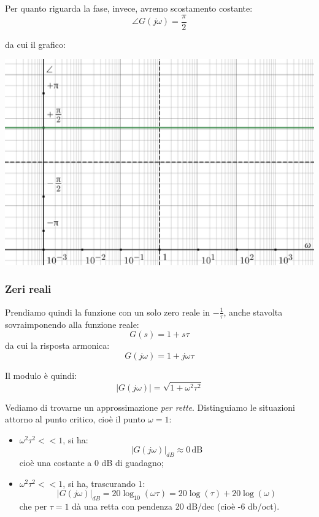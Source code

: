 \documentclass[a4paper,11pt]{article}
\begin{document}
\par\medskip

Per quanto riguarda la fase, invece, avremo scostamento costante:
$$
\angle G(j \omega) =  \frac{\pi}{2}
$$

\par\medskip

\noindent
\begin{minipage}{\textwidth}
da cui il grafico:
\begin{center}
	\includegraphics[scale=0.3]{../figures/differentiator_bode/phase.png}
\end{center}
\end{minipage}

\par\medskip

\subsubsection{Zeri reali}
Prendiamo quindi la funzione con un solo zero reale in $-\frac{1}{\tau}$, anche stavolta sovraimponendo alla funzione reale:
$$
G(s) = 1 + s \tau
$$
da cui la risposta armonica:
$$
G(j \omega) = 1 + j \omega \tau
$$

Il modulo è quindi:
$$
|G(j \omega)| = \sqrt{1 + \omega^2 \tau^2}
$$

Vediamo di trovarne un approssimazione \textit{per rette}.
Distinguiamo le situazioni attorno al punto critico, cioè il punto $\omega = 1$:
\begin{itemize}
	\item $\omega^2 \tau^2 << 1$, si ha:
		$$
		|G(j\omega)|_{dB} \approx 0 \, \mathrm{dB}
		$$
		cioè una costante a 0 dB di guadagno;
	\item $\omega^2 \tau^2 << 1$, si ha, trascurando $1$:
		$$
		|G(j \omega)|_{dB} = 20 \log_{10} \left( \omega \tau \right) =
		20 \log \left( \tau \right) + 20 \log \left( \omega \right)
		$$
		che per $\tau = 1$ dà una retta con pendenza 20 dB/dec (cioè -6 db/oct).
\end{itemize}
\end{document}
